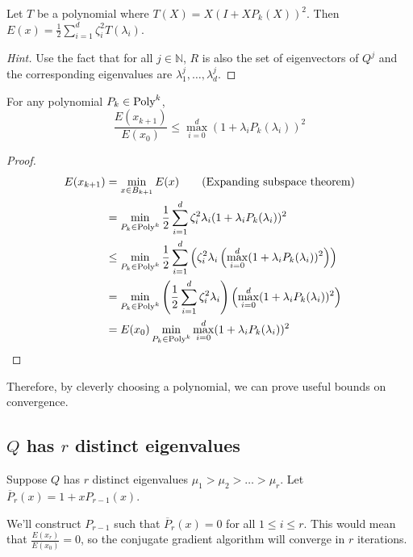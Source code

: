 \begin{lemma}[Homework]
Let $T$ be a polynomial where $T(X) = X(I + XP_k(X))^2$. Then
$E(x) = \frac{1}{2} \sum_{i=1}^d \zeta_i^2 T(\lambda_i)$.
\end{lemma}
\begin{proof}[Hint]
Use the fact that for all $j \in \mathbb{N}$,
$R$ is also the set of eigenvectors of $Q^j$
and the corresponding eigenvalues are $\lambda_1^j, \ldots, \lambda_d^j$.
\end{proof}

\begin{lemma}
For any polynomial $P_k \in \textrm{Poly}^{k}$,
\[ \frac{E(x_{k+1})}{E(x_0)} \le \max_{i=0}^d (1 + \lambda_i P_k(\lambda_i))^2 \]
\end{lemma}
\begin{proof}
\begin{align*}
E(x_{k+1}) &= \min_{x \in B_{k+1}} E(x)  \tag{Expanding subspace theorem}
\\ &= \min_{P_k \in \textrm{Poly}^{k}} \frac{1}{2} \sum_{i=1}^d \zeta_i^2 \lambda_i(1 + \lambda_iP_k(\lambda_i))^2
\\ &\le \min_{P_k \in \textrm{Poly}^{k}} \frac{1}{2} \sum_{i=1}^d \left(\zeta_i^2 \lambda_i
    \left(\max_{i=0}^d (1 + \lambda_i P_k(\lambda_i))^2\right)\right)
\\ &= \min_{P_k \in \textrm{Poly}^{k}} \left( \frac{1}{2} \sum_{i=1}^d \zeta_i^2 \lambda_i \right)
    \left(\max_{i=0}^d (1 + \lambda_i P_k(\lambda_i))^2\right)
\\ &= E(x_0) \min_{P_k \in \textrm{Poly}^{k}} \max_{i=0}^d (1 + \lambda_i P_k(\lambda_i))^2
\end{align*}
\end{proof}

Therefore, by cleverly choosing a polynomial, we can prove useful bounds on convergence.

\subsection{\texorpdfstring{$Q$}{Q} has \texorpdfstring{$r$}{r} distinct eigenvalues}

Suppose $Q$ has $r$ distinct eigenvalues $\mu_1 > \mu_2 > \ldots > \mu_r$.
Let $\overline{P}_r(x) = 1 + x P_{r-1}(x)$.

We'll construct $P_{r-1}$ such that $\overline{P}_r(x) = 0$ for all $1 \le i \le r$.
This would mean that $\frac{E(x_r)}{E(x_0)} = 0$, so
the conjugate gradient algorithm will converge in $r$ iterations.

